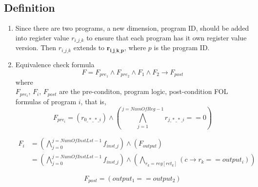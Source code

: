 \documentclass{article}
\begin{document}
\subsection{Definition}
\begin{enumerate}
\item Since there are two programs, a new dimension, program ID, should be added into register value $r_{i\_j\_k}$ to ensure that each program has it own register value version. Then $r_{i\_j\_k}$ extends to $\bm{r_{i\_j\_k\_p}}$, where $p$ is the program ID.
\item Equivalence check formula
\begin{equation}
F = F_{pre_1} \wedge F_{pre_2} \wedge F_1 \wedge F_2 \rightarrow F_{post}
\end{equation}
where \\
$F_{pre_i}$, $F_i$, $F_{post}$ are the pre-conditon, program logic, post-condition FOL formulas of program $i$, that is,
\begin{equation}
F_{pre_i} = (r_{0\_*\_*\_i})\wedge (\bigwedge_{j = 1}^{j = NumOfReg-1} r_{j\_*\_*\_i} == 0) 
\end{equation}

\begin{equation}
\begin{aligned}
F_{i} &= (\bigwedge_{j=0}^{j=NumOfInstLst-1} f_{inst\_j}) \wedge (F_{output}) \\
&= (\bigwedge_{j=0}^{j=NumOfInstLst-1} f_{inst\_j}) \wedge (\bigwedge_{r_k = reg[ret_k]} (c \rightarrow r_k == output_i))
\end{aligned}
\end{equation}

\begin{equation}
F_{post} = (output_1 == output_2)
\end{equation}
\end{enumerate}
\end{document}
